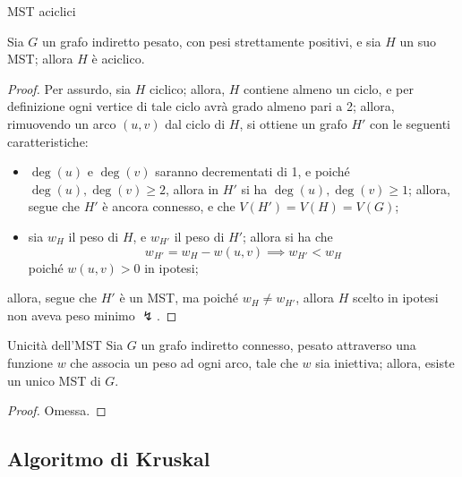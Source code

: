 \documentclass[a4paper, 12pt]{report}
\begin{document}
    \begin{framedlem}{MST aciclici}
        \label{lemma mst}

        Sia $G$ un grafo indiretto pesato, con pesi strettamente positivi, e sia $H$ un suo MST; allora $H$ è aciclico.
    \end{framedlem}

    \begin{proof}
        Per assurdo, sia $H$ ciclico; allora, $H$ contiene almeno un ciclo, e per definizione ogni vertice di tale ciclo avrà grado almeno pari a 2; allora, rimuovendo un arco $(u, v)$ dal ciclo di $H$, si ottiene un grafo $H'$ con le seguenti caratteristiche:

        \begin{itemize}
            \item $\deg(u)$ e $\deg(v)$ saranno decrementati di 1, e poiché $\deg(u), \deg(v) \ge 2$, allora in $H'$ si ha $\deg(u), \deg(v) \ge 1$; allora, segue che $H'$ è ancora connesso, e che $V(H') = V(H) = V(G)$;
            \item sia $w_H$ il peso di $H$, e $w_{H'}$ il peso di $H'$; allora si ha che $$w_{H'} = w_H - w(u, v) \implies w_{H'} < w_H$$ poiché $w(u, v) > 0$ in ipotesi;
        \end{itemize}

        allora, segue che $H'$ è un MST, ma poiché $w_H \neq w_{H'}$, allora $H$ scelto in ipotesi non aveva peso minimo $\lightning$.
    \end{proof}

    \begin{framedlem}{Unicità dell'MST}
        Sia $G$ un grafo indiretto connesso, pesato attraverso una funzione $w$ che associa un peso ad ogni arco, tale che $w$ sia iniettiva; allora, esiste un unico MST di $G$.
    \end{framedlem}

    \begin{proof}
        Omessa.
    \end{proof}

    \subsection{Algoritmo di Kruskal}
\end{document}
